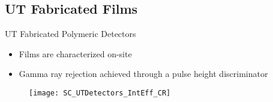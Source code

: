 \subsection{UT Fabricated Films}
\begin{frame}{UT Fabricated Polymeric Detectors}
\label{PHDMain}
  \begin{itemize}
    \item Films are characterized on-site
    \item Gamma ray rejection achieved through a pulse height discriminator
  \end{itemize}
  \begin{figure}
    \texttt{[image: SC\_UTDetectors\_IntEff\_CR]}
  \end{figure}
\hyperlink{MeasMethods}{}
\end{frame}
